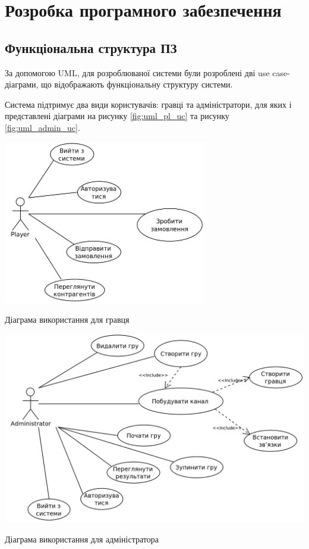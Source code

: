 \section{Розробка програмного забезпечення}
\subsection{Функціональна структура ПЗ}
За допомогою UML, для розроблюваної системи були розроблені дві use case-діаграми, що відображають функціональну структуру системи.

Система підтримує два види користувачів: гравці та адміністратори, для яких і представлені діаграми на рисунку \ref{fig:uml_pl_uc} та рисунку \ref{fig:uml_admin_uc}.
\begin{stdfigure}
    \includegraphics[width=3.5in]{images/uml/player_use_cases.png}
    \caption{Діаграма використання для гравця}
    \label{fig:uml_pl_uc}
\end{stdfigure}   

\begin{stdfigure}
    \includegraphics[width=6in]{images/uml/admin_use_cases.png}
    \caption{Діаграма використання для адміністратора}
    \label{fig:uml_admin_uc}
\end{stdfigure}

